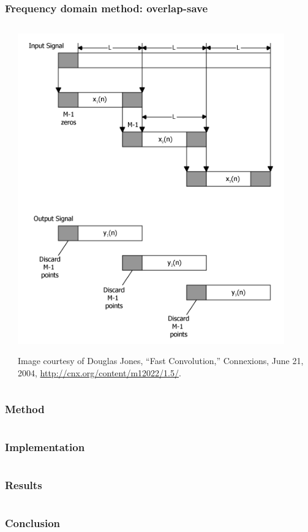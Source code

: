 \documentclass{beamer}
\begin{document}
\section[Method]{}

\begin{frame}
	\frametitle{Frequency domain method: overlap-save}
	\begin{columns}
		\begin{column}{0.5\textwidth}
		\end{column}
		\begin{column}{0.5\textwidth}
			\includegraphics[width=0.9\textwidth]{figures/overlap-save}
			\begin{flushright}
			\scriptsize{Image courtesy of Douglas Jones, ``Fast Convolution,'' Connexions, June 21, 2004, \url{http://cnx.org/content/m12022/1.5/}.}
			\end{flushright}
		\end{column}
	\end{columns}
\end{frame}


\begin{frame}
\frametitle{Method}
\end{frame}


\section[Implementation]{}


\begin{frame}
\frametitle{Implementation}
\end{frame}


\section[Results]{}


\begin{frame}
\frametitle{Results}
\end{frame}


\section[Conclusion]{}


\begin{frame}
\frametitle{Conclusion}
\end{frame}
\end{document}
